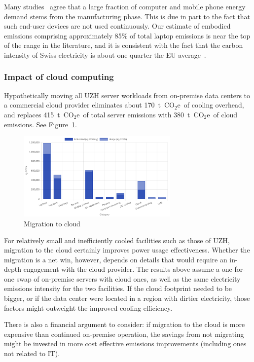 \documentclass[11pt]{article}
\newcommand{\coe}{CO$_2$e}
\newcommand{\tcoe}{t~\coe}
\let\cite\parencite
\begin{document}
Many studies~\cite{wb:itu:ict,umich:factsheet} agree that a large fraction of computer and mobile phone energy demand stems from the manufacturing phase. This is due in part to the fact that such end-user devices are not used continuously. Our estimate of embodied emissions comprising approximately 85\% of total laptop emissions is near the top of the range in the literature, and it is consistent with the fact that the carbon intensity of Swiss electricity is about one quarter the EU average~\cite{electricitymaps}.

\subsubsection*{Impact of cloud computing}

Hypothetically moving all UZH server workloads from on-premise data centers to a commercial cloud provider eliminates about 170~\tcoe\ of cooling overhead, and replaces 415~\tcoe\ of total server emissions with 380~\tcoe\ of cloud emissions. See Figure~\ref{fig:cloud}.

\begin{figure}[h]
  \centering
  \includegraphics[width=0.7\textwidth]{fig-cloud.png}
  \caption{Migration to cloud}
  \label{fig:cloud}
\end{figure}

For relatively small and inefficiently cooled facilities such as those of UZH, migration to the cloud certainly improves power usage effectiveness. Whether the migration is a net win, however, depends on details that would require an in-depth engagement with the cloud provider. The results above assume a one-for-one swap of on-premise servers with cloud ones, as well as the same electricity emissions intensity for the two facilities. If the cloud footprint needed to be bigger, or if the data center were located in a region with dirtier electricity, those factors might outweight the improved cooling efficiency.

There is also a financial argument to consider: if migration to the cloud is more expensive than continued on-premise operation, the savings from not migrating might be invested in more cost effective emissions improvements (including ones not related to IT).
\end{document}
